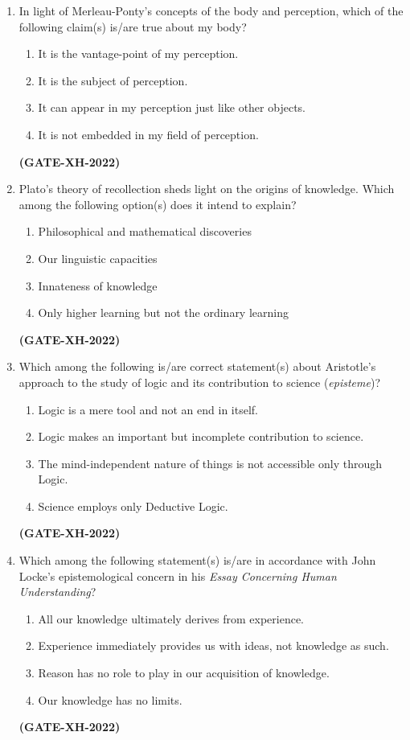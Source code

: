 \documentclass[journal]{IEEEtran}
\begin{document}
\begin{enumerate}
\item In light of Merleau-Ponty’s concepts of the body and perception, which of the following claim(s) is/are true about my body?
\begin{enumerate}
\item It is the vantage-point of my perception.  
\item It is the subject of perception.  
\item It can appear in my perception just like other objects.  
\item It is not embedded in my field of perception.  
\end{enumerate}
\hfill\textbf{(GATE-XH-2022)}

\item Plato's theory of recollection sheds light on the origins of knowledge. Which among the following option(s) does it intend to explain?
\begin{enumerate}
\item Philosophical and mathematical discoveries  
\item Our linguistic capacities  
\item Innateness of knowledge  
\item Only higher learning but not the ordinary learning  
\end{enumerate}
\hfill\textbf{(GATE-XH-2022)}

\item Which among the following is/are correct statement(s) about Aristotle’s approach to the study of logic and its contribution to science (\textit{episteme})?
\begin{enumerate}
\item Logic is a mere tool and not an end in itself.  
\item Logic makes an important but incomplete contribution to science.  
\item The mind-independent nature of things is not accessible only through Logic.  
\item Science employs only Deductive Logic.  
\end{enumerate}
\hfill\textbf{(GATE-XH-2022)}

\item Which among the following statement(s) is/are in accordance with John Locke’s epistemological concern in his \textit{Essay Concerning Human Understanding}?

\begin{enumerate}
\item All our knowledge ultimately derives from experience.  
\item Experience immediately provides us with ideas, not knowledge as such.  
\item Reason has no role to play in our acquisition of knowledge.  
\item Our knowledge has no limits.  
\end{enumerate}
\hfill\textbf{(GATE-XH-2022)}


\end{enumerate}
\end{document}
